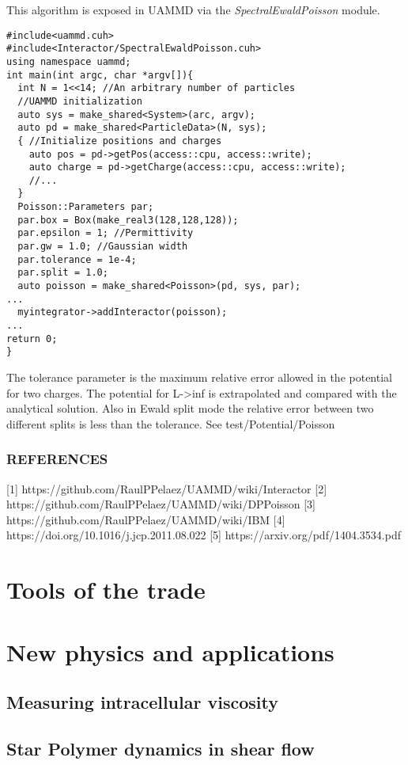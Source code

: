 \documentclass[ twoside,openright,titlepage,numbers=noenddot,%
headinclude,footinclude,cleardoublepage=empty,abstract=on,
BCOR=5mm,paper=a4,fontsize=11pt
]{scrreprt}
\newcommand{\uammd}{\gls{UAMMD}\xspace}
\begin{document}
This algorithm is exposed in \uammd via the \emph{SpectralEwaldPoisson} module.

\begin{verbatim}
#include<uammd.cuh>
#include<Interactor/SpectralEwaldPoisson.cuh>
using namespace uammd;
int main(int argc, char *argv[]){
  int N = 1<<14; //An arbitrary number of particles
  //UAMMD initialization
  auto sys = make_shared<System>(arc, argv);
  auto pd = make_shared<ParticleData>(N, sys);
  { //Initialize positions and charges
    auto pos = pd->getPos(access::cpu, access::write);
    auto charge = pd->getCharge(access::cpu, access::write);
    //...
  }
  Poisson::Parameters par;
  par.box = Box(make_real3(128,128,128));
  par.epsilon = 1; //Permittivity
  par.gw = 1.0; //Gaussian width
  par.tolerance = 1e-4;
  par.split = 1.0;
  auto poisson = make_shared<Poisson>(pd, sys, par);
...
  myintegrator->addInteractor(poisson);
...
return 0;
}
\end{verbatim}
The tolerance parameter is the maximum relative error allowed in the potential for two charges. The potential for L->inf is extrapolated and compared with the analytical solution. Also in Ewald split mode the relative error between two different splits is less than the tolerance. See test/Potential/Poisson  
\section{REFERENCES}
[1] https://github.com/RaulPPelaez/UAMMD/wiki/Interactor   
[2] https://github.com/RaulPPelaez/UAMMD/wiki/DPPoisson  
[3] https://github.com/RaulPPelaez/UAMMD/wiki/IBM  
[4] https://doi.org/10.1016/j.jcp.2011.08.022  
[5] https://arxiv.org/pdf/1404.3534.pdf  
\newpage
\cleardoublepage
{}
\part{Tools of the trade}\label{pt:tools}


\newpage
\cleardoublepage
\part{New physics and applications}\label{pt:applications}
\chapter{Measuring intracellular viscosity}
\chapter{Star Polymer dynamics in shear flow}
\end{document}
